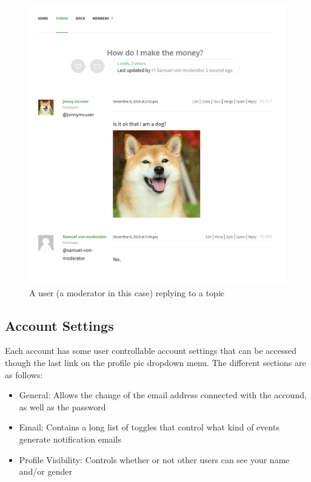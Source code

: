 \documentclass[10pt]{article}
\begin{document}
\begin{figure}[H]
    \centering
    \includegraphics[scale=0.4]{images/nodoggo.jpg}
    \caption{A user (a moderator in this case) replying to a topic}
    \label{nodoggo}
\end{figure}




\subsection{Account Settings}
\begin{flushleft}
Each account has some user controllable account settings that can be accessed though the last link on the profile pic dropdown menu.  The different sections are as follows:
\end{flushleft}


\begin{itemize}
    \item General:  Allows the change of the email address connected with the accound, as well as the password
    \item Email: Contains a long list of toggles that control what kind of events generate notification emails
    \item Profile Visibility: Controls whether or not other users can see your name and/or gender
\end{itemize}
\end{document}
